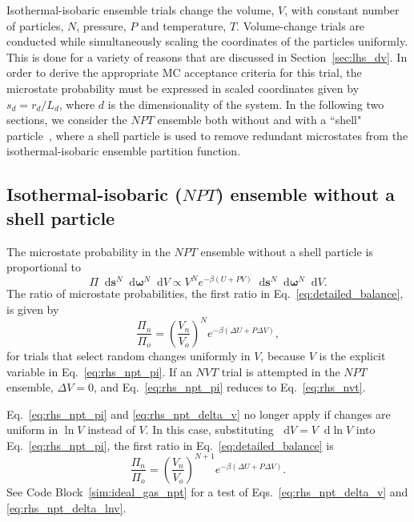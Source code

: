 \documentclass[
  9pt,
  bestpractices,
]{livecoms}
\newcommand*\diff{\mathop{}\!\mathrm{d}}
\begin{document}
Isothermal-isobaric ensemble trials change the volume, $V$, with constant number of particles, $N$, pressure, $P$ and temperature, $T$.
Volume-change trials are conducted while simultaneously scaling the coordinates of the particles uniformly.
This is done for a variety of reasons that are discussed in Section~\ref{sec:lhs_dv}.
In order to derive the appropriate MC acceptance criteria for this trial, the microstate probability must be expressed in scaled coordinates given by $s_d = r_d/L_d$, where $d$ is the dimensionality of the system.
In the following two sections, we consider the $NPT$ ensemble both without and with a ``shell" particle~\cite{koper_length_1996, corti_deriving_1998, hatch_theory_2024}, where a shell particle is used to remove redundant microstates from the isothermal-isobaric ensemble partition function.

\subsection{\label{sec:rhs_npt_shell}Isothermal-isobaric ($NPT$) ensemble without a shell particle}

The microstate probability in the $NPT$ ensemble without a shell particle is proportional to \cite{wood_monte_1968, allen_computer_1989, frenkel_understanding_2002}
\begin{equation}
\Pi \diff\mathbf{s}^{N}\diff\boldsymbol{\omega}^{N}\diff V \propto V^{N} e^{-\beta(U+P V)} \diff\mathbf{s}^{N} \diff\boldsymbol{\omega}^{N}\diff V.
\label{eq:rhs_npt_pi}
\end{equation}
The ratio of microstate probabilities, the first ratio in Eq.~\ref{eq:detailed_balance}, is given by
\begin{equation}
\frac{\Pi_n}{\Pi_o} = \left(\frac{V_n}{V_o}\right)^{N}e^{-\beta(\Delta U + P\Delta V)},
\label{eq:rhs_npt_delta_v}
\end{equation}
for trials that select random changes uniformly in $V$, because $V$ is the explicit variable in Eq.~\ref{eq:rhs_npt_pi}.
If an $NVT$ trial is attempted in the $NPT$ ensemble, $\Delta V=0$, and Eq.~\ref{eq:rhs_npt_pi} reduces to Eq.~\ref{eq:rhs_nvt}.

Eq.~\ref{eq:rhs_npt_pi} and \ref{eq:rhs_npt_delta_v} no longer apply if changes are uniform in $\ln V$ instead of $V$.
In this case, substituting $\diff V=V\diff\ln V$ into Eq.~\ref{eq:rhs_npt_pi}, the first ratio in Eq.~\ref{eq:detailed_balance} is
\begin{equation}
\frac{\Pi_n}{\Pi_o} = \left(\frac{V_n}{V_o}\right)^{N+1}e^{-\beta(\Delta U + P\Delta V)}.
\label{eq:rhs_npt_delta_lnv}
\end{equation}
See Code Block~\ref{sim:ideal_gas_npt} for a test of Eqs.~\ref{eq:rhs_npt_delta_v} and \ref{eq:rhs_npt_delta_lnv}.
\end{document}
